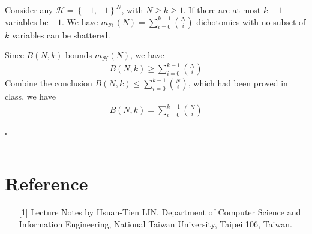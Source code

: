 \documentclass[12pt]{article}
\newcommand*{\QEDB}{\hfill\ensuremath{\square}}
\newcommand{\CBrackets}[1]{\left\{#1\right\}}
\newcommand{\ParTh}[1]{\left(#1\right)}
\newcommand{\horrule}[1]{\rule{\linewidth}{#1}}
\begin{document}

Consider any $\mathcal{H}=\CBrackets{-1,+1}^N$, with $N\geq k\geq 1$. If there are at most $k-1$ variables be $-1$. We have $m_{\mathcal{H}}\ParTh{N}=\sum_{i=0}^{k-1}\binom{N}{i}$ dichotomies with no subset of $k$ variables can be shattered.

Since $B\ParTh{N,k}$ bounds $m_{\mathcal{H}}\ParTh{N}$, we have
\begin{align}
B\ParTh{N,k}\geq\sum_{i=0}^{k-1}\binom{N}{i}
\end{align}
Combine the conclusion $B\ParTh{N,k}\leq\sum_{i=0}^{k-1}\binom{N}{i}$, which had been proved in class, we have
\begin{align}
B\ParTh{N,k}=\sum_{i=0}^{k-1}\binom{N}{i}
\end{align}

\QEDB

\horrule{0.5pt}

\section*{Reference}

\begin{enumerate}

\item[{[1]}] Lecture Notes by Hsuan-Tien LIN, Department of Computer Science and Information Engineering, National Taiwan University, Taipei 106, Taiwan.


\end{enumerate}
\end{document}
